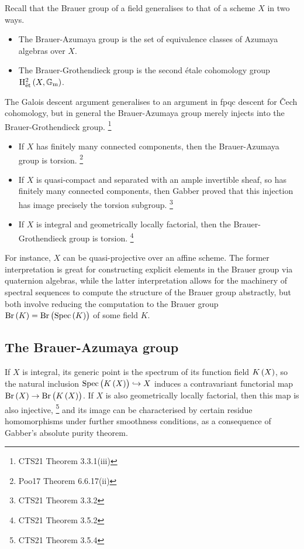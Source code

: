 \documentclass{article}
\newcommand{\br}{\del}
\newcommand{\Br}{\mathrm{Br}}
\newcommand{\et}{\mathrm{\acute{e}t}}
\newcommand{\Gm}{\mathbb{G}_\mathrm{m}}
\renewcommand{\H}{\mathrm{H}}
\newcommand{\Spec}{\mathrm{Spec}}
\begin{document}
Recall that the Brauer group of a field generalises to that of a scheme $ X $ in two ways.
\begin{itemize}
\item The Brauer-Azumaya group is the set of equivalence classes of Azumaya algebras over $ X $.
\item The Brauer-Grothendieck group is the second \'etale cohomology group $ \H_\et^2\br{X, \Gm} $.
\end{itemize}
The Galois descent argument generalises to an argument in fpqc descent for \v Cech cohomology, but in general the Brauer-Azumaya group merely injects into the Brauer-Grothendieck group. \footnote{CTS21 Theorem 3.3.1(iii)}
\begin{itemize}
\item If $ X $ has finitely many connected components, then the Brauer-Azumaya group is torsion. \footnote{Poo17 Theorem 6.6.17(ii)}
\item If $ X $ is quasi-compact and separated with an ample invertible sheaf, so has finitely many connected components, then Gabber proved that this injection has image precisely the torsion subgroup. \footnote{CTS21 Theorem 3.3.2}
\item If $ X $ is integral and geometrically locally factorial, then the Brauer-Grothendieck group is torsion. \footnote{CTS21 Theorem 3.5.2}
\end{itemize}
For instance, $ X $ can be quasi-projective over an affine scheme. The former interpretation is great for constructing explicit elements in the Brauer group via quaternion algebras, while the latter interpretation allows for the machinery of spectral sequences to compute the structure of the Brauer group abstractly, but both involve reducing the computation to the Brauer group $ \Br\br{K} = \Br\br{\Spec\br{K}} $ of some field $ K $.

\pagebreak

\subsection{The Brauer-Azumaya group}

If $ X $ is integral, its generic point is the spectrum of its function field $ K\br{X} $, so the natural inclusion $ \Spec\br{K\br{X}} \hookrightarrow X $ induces a contravariant functorial map $ \Br\br{X} \to \Br\br{K\br{X}} $. If $ X $ is also geometrically locally factorial, then this map is also injective, \footnote{CTS21 Theorem 3.5.4} and its image can be characterised by certain residue homomorphisms under further smoothness conditions, as a consequence of Gabber's absolute purity theorem.
\end{document}
